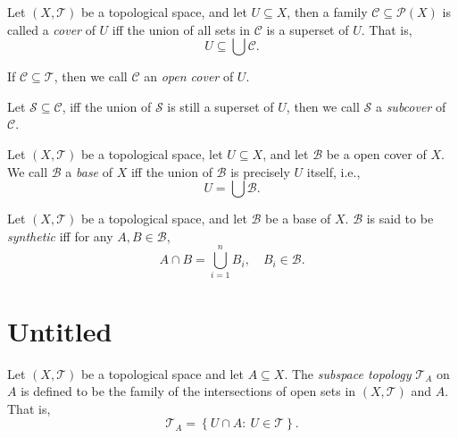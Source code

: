 \begin{definition}
	[cover]
	\label{def: cover}
	Let $(X, \mathcal T)$ be a topological space, and let $U \subseteq X$, then a family $\mathcal C \subseteq \mathcal P(X)$ is called a \textit{cover} of $U$ iff the union of all sets in $\mathcal C$ is a superset of $U$. That is,
	$$
	U \subseteq \bigcup \mathcal C.
	$$
	
	If $\mathcal C \subseteq \mathcal T$, then we call $\mathcal C$ an \textit{open cover} of $U$.
	
	Let $\mathcal S \subseteq \mathcal C$, iff the union of $\mathcal S$ is still a superset of $U$, then we call $\mathcal S$ a \textit{subcover} of $\mathcal C$.
\end{definition}


\begin{definition}
	[basis]
	\label{def: basis}
	Let $(X, \mathcal T)$ be a topological space, let $U \subseteq X$, and let $\mathcal B$ be a open cover of $X$. We call $\mathcal B$ a \textit{base} of $X$ iff the union of $\mathcal B$ is precisely $U$ itself, i.e.,
	$$
	U = \bigcup \mathcal B.
	$$
\end{definition}


\begin{definition}
	\label{def: synthetic basis}
	Let $(X, \mathcal T)$ be a topological space, and let $\mathcal B$ be a base of $X$. $\mathcal B$ is said to be \textit{synthetic} iff for any $A, B \in \mathcal B$,
	$$
	A \cap B = \bigcup_{i = 1}^{n} B_i, \quad B_i \in \mathcal B.
	$$
\end{definition}


\section{Untitled}


\begin{definition}
	\label{def: subspace topology}
	Let $(X, \mathcal T)$ be a topological space and let $A \subseteq X$. The \textit{subspace topology} $\mathcal T_A$ on $A$ is defined to be the family of the intersections of open sets in $(X, \mathcal T)$ and $A$. That is,
	$$
	\mathcal T_A = \left\{ U \cap A : \ U \in \mathcal T \right\}.
	$$
\end{definition}


